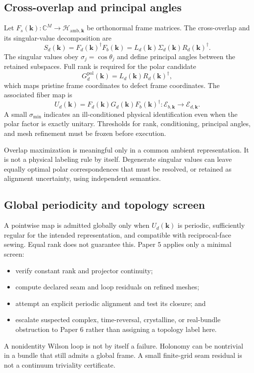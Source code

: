 \documentclass[11pt]{article}
\newenvironment{prospective}{\color{prospectivered}}{}
\begin{document}
\begin{prospective}
\subsection{Cross-overlap and principal angles}
Let $F_s(\mathbf k):\mathbb C^M\rightarrow\mathcal H_{\mathrm{amb},\mathbf k}$ be
orthonormal frame matrices. The cross-overlap and its singular-value decomposition are
\begin{equation}
 S_d(\mathbf k)=F_d(\mathbf k)^\dagger F_b(\mathbf k)
 =L_d(\mathbf k)\Sigma_d(\mathbf k)R_d(\mathbf k)^\dagger.
\end{equation}
The singular values obey $\sigma_j=\cos\theta_j$ and define principal angles between the
retained subspaces. Full rank is required for the polar candidate
\begin{equation}
 G_d^{\mathrm{pol}}(\mathbf k)=L_d(\mathbf k)R_d(\mathbf k)^\dagger,
\end{equation}
which maps pristine frame coordinates to defect frame coordinates. The associated fiber
map is
\begin{equation}
 U_d(\mathbf k)=F_d(\mathbf k)G_d(\mathbf k)F_b(\mathbf k)^\dagger
 :\mathcal E_{b,\mathbf k}\rightarrow\mathcal E_{d,\mathbf k}.
\end{equation}
A small $\sigma_{\min}$ indicates an ill-conditioned physical identification even when
the polar factor is exactly unitary. Thresholds for rank, conditioning, principal
angles, and mesh refinement must be frozen before execution.

Overlap maximization is meaningful only in a common ambient representation. It is not a
physical labeling rule by itself. Degenerate singular values can leave equally optimal
polar correspondences that must be resolved, or retained as alignment uncertainty, using
independent semantics.

\subsection{Global periodicity and topology screen}
A pointwise map is admitted globally only when $U_d(\mathbf k)$ is periodic, sufficiently
regular for the intended representation, and compatible with reciprocal-face sewing.
Equal rank does not guarantee this. Paper 5 applies only a minimal screen:
\begin{itemize}
 \item verify constant rank and projector continuity;
 \item compute declared seam and loop residuals on refined meshes;
 \item attempt an explicit periodic alignment and test its closure; and
 \item escalate suspected complex, time-reversal, crystalline, or real-bundle
 obstruction to Paper 6 rather than assigning a topology label here.
\end{itemize}
A nonidentity Wilson loop is not by itself a failure. Holonomy can be nontrivial in a
bundle that still admits a global frame. A small finite-grid seam residual is not a
continuum triviality certificate.


\end{prospective}
\end{document}
